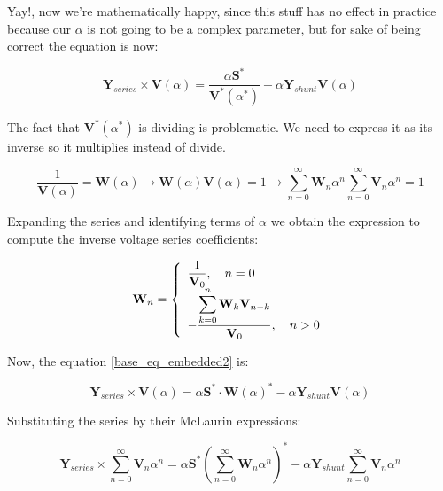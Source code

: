\documentclass[nols,a4paper,twoside,notoc,fleqn]{tufte-book}
\begin{document}
	Yay!, now we're mathematically happy, since this stuff has no effect in practice because our $\alpha$ is not going to be a complex parameter, but for sake of being correct the equation is now:
	
	\begin{equation}
	{\textbf{Y}_{series}\times \textbf{V}( \alpha )} = \frac{ \alpha\textbf{S}^*}{\textbf{V}^*( \alpha^* )} - \alpha \textbf{Y}_{shunt} \textbf{V}( \alpha )
	\label{base_eq_embedded2}
	\end{equation}
	



The fact that $\textbf{V}^*( \alpha^* )$ is dividing is problematic. We need to express it as its inverse so it multiplies instead of divide.

\begin{equation} 
\frac{1}{\textbf{V}( \alpha)} = \textbf{W}( \alpha ) \longrightarrow \textbf{W}( \alpha ) \textbf{V}( \alpha) = 1 \longrightarrow \sum_{n=0}^{\infty}{\textbf{W}_n \alpha^n}  \sum_{n=0}^{\infty}{\textbf{V}_n \alpha^n} = 1
\end{equation}

Expanding the series and identifying terms of $\alpha$ we obtain the expression to compute the inverse voltage series coefficients:

\begin{equation}
\textbf{W}_n =
\left\{
\begin{array}{ll}
\mathlarger{\frac{1}{\textbf{V}_0}}, \quad n=0\\
\mathlarger{-\frac{\mathlarger{\sum_{k=0}^{n}\textbf{W}_k \textbf{V}_{n-k}}}{\textbf{V}_0}}, \quad n>0
\end{array}
\right.
\end{equation}


Now, the equation \ref{base_eq_embedded2} is:

\begin{equation}
{\textbf{Y}_{series}\times \textbf{V}( \alpha )} = \alpha\textbf{S}^* \cdot \textbf{W}( \alpha)^*  - \alpha \textbf{Y}_{shunt} \textbf{V}( \alpha )
\label{base_eq_embedded3}
\end{equation}

Substituting the series by their McLaurin expressions:

\begin{equation}
{\textbf{Y}_{series}\times \sum_{n=0}^{\infty}{\textbf{V}_n \alpha^n}} = \alpha\textbf{S}^* \left(\sum_{n=0}^{\infty}{\textbf{W}_n \alpha^n}\right)^*  - \alpha \textbf{Y}_{shunt} \sum_{n=0}^{\infty}{\textbf{V}_n \alpha^n}
\label{base_eq_embedded4}
\end{equation}
\end{document}
